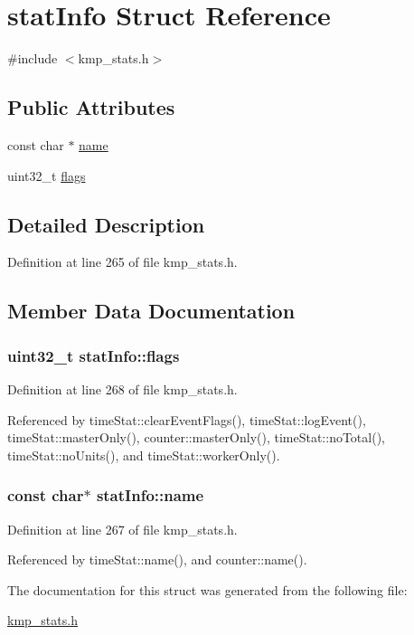 \hypertarget{structstatInfo}{\section{stat\-Info Struct Reference}
\label{structstatInfo}
}


{\ttfamily \#include $<$kmp\-\_\-stats.\-h$>$}

\subsection*{Public Attributes}
\begin{DoxyCompactItemize}
\item 
const char $\ast$ \hyperlink{structstatInfo_a83052615f9578ba88744140093a18f37}{name}
\item 
uint32\-\_\-t \hyperlink{structstatInfo_a590c3b9a2b0786720e9a53b0dd6071fd}{flags}
\end{DoxyCompactItemize}


\subsection{Detailed Description}


Definition at line 265 of file kmp\-\_\-stats.\-h.



\subsection{Member Data Documentation}
\hypertarget{structstatInfo_a590c3b9a2b0786720e9a53b0dd6071fd}{
\subsubsection[{flags}]{\setlength{\rightskip}{0pt plus 5cm}uint32\-\_\-t stat\-Info\-::flags}}\label{structstatInfo_a590c3b9a2b0786720e9a53b0dd6071fd}


Definition at line 268 of file kmp\-\_\-stats.\-h.



Referenced by time\-Stat\-::clear\-Event\-Flags(), time\-Stat\-::log\-Event(), time\-Stat\-::master\-Only(), counter\-::master\-Only(), time\-Stat\-::no\-Total(), time\-Stat\-::no\-Units(), and time\-Stat\-::worker\-Only().

\hypertarget{structstatInfo_a83052615f9578ba88744140093a18f37}{
\subsubsection[{name}]{\setlength{\rightskip}{0pt plus 5cm}const char$\ast$ stat\-Info\-::name}}\label{structstatInfo_a83052615f9578ba88744140093a18f37}


Definition at line 267 of file kmp\-\_\-stats.\-h.



Referenced by time\-Stat\-::name(), and counter\-::name().



The documentation for this struct was generated from the following file\-:\begin{DoxyCompactItemize}
\item 
\hyperlink{kmp__stats_8h}{kmp\-\_\-stats.\-h}\end{DoxyCompactItemize}
